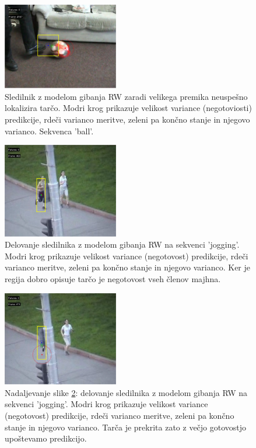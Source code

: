 \documentclass[a4paper]{article}
\begin{document}
\begin{figure}[h]
	\begin{center}
		\includegraphics [width=0.45\textwidth] {rwball.pdf}
	\end{center}
	\caption{Sledilnik z modelom gibanja RW zaradi velikega premika neuspešno lokalizira tarčo. Modri krog prikazuje velikost variance (negotoviosti) predikcije, rdeči varianco meritve, zeleni pa končno stanje in njegovo varianco. Sekvenca 'ball'.}
	\label{rwball}
\end{figure}
\begin{figure}[h!]
	\begin{center}
		\includegraphics [width=0.45\textwidth] {rwjogging1.pdf}
	\end{center}
	\caption{Delovanje sledilnika z modelom gibanja RW na sekvenci 'jogging'. Modri krog prikazuje velikost variance (negotovost) predikcije, rdeči varianco meritve, zeleni pa končno stanje in njegovo varianco. Ker je regija dobro opisuje tarčo je negotovost vseh členov majhna.}
	\label{rwjogging1}
\end{figure}
\begin{figure}[h!]
	\begin{center}
		\includegraphics [width=0.45\textwidth] {rwjogging2.pdf}
	\end{center}
	\caption{Nadaljevanje slike \ref{rwjogging1}: delovanje sledilnika z modelom gibanja RW na sekvenci 'jogging'. Modri krog prikazuje velikost variance (negotovost) predikcije, rdeči varianco meritve, zeleni pa končno stanje in njegovo varianco. Tarča je prekrita zato z večjo gotovostjo upoštevamo predikcijo.}
	\label{rwjogging2}
\end{figure}
\end{document}
